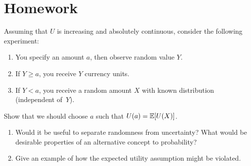 \documentclass[twoside,a4paper]{article}
\begin{document}
\section{Homework}
\begin{exercise}
  Assuming that $U$ is increasing and absolutely continuous, consider the following experiment:
  \begin{enumerate}
  \item You specify an amount $a$, then observe random value $Y$.
  \item If $Y \geq a$, you receive $Y$ currency units.
  \item If $Y < a$, you receive a random amount $X$ with known distribution (independent of~$Y$).
  \end{enumerate}
  Show that we should choose $a$ such that $U(a) = \mathop{\mbox{\ensuremath{\mathbb{E}}}}\nolimits[U(X)]$.
\end{exercise}

\begin{exercise}
  \begin{enumerate}
    \item Would it be useful to separate randomness from uncertainty? What would be desirable properties of an alternative concept to probability?
  \item Give an example of how the expected utility assumption might be violated.
  \end{enumerate}
\end{exercise}
\end{document}
